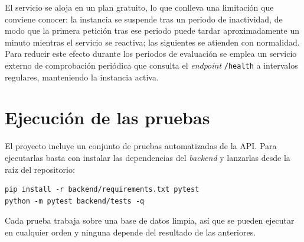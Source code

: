 El servicio se aloja en un plan gratuito, lo que conlleva una limitación que conviene conocer: la
instancia se suspende tras un periodo de inactividad, de modo que la primera petición tras ese
periodo puede tardar aproximadamente un minuto mientras el servicio se reactiva; las siguientes se
atienden con normalidad. Para reducir este efecto durante los periodos de evaluación se emplea un
servicio externo de comprobación periódica que consulta el \textit{endpoint} \texttt{/health} a
intervalos regulares, manteniendo la instancia activa.

\section{Ejecución de las pruebas}

El proyecto incluye un conjunto de pruebas automatizadas de la API. Para ejecutarlas basta con
instalar las dependencias del \textit{backend} y lanzarlas desde la raíz del repositorio:

\begin{verbatim}
pip install -r backend/requirements.txt pytest
python -m pytest backend/tests -q
\end{verbatim}

Cada prueba trabaja sobre una base de datos limpia, así que se pueden ejecutar en cualquier orden y
ninguna depende del resultado de las anteriores.
